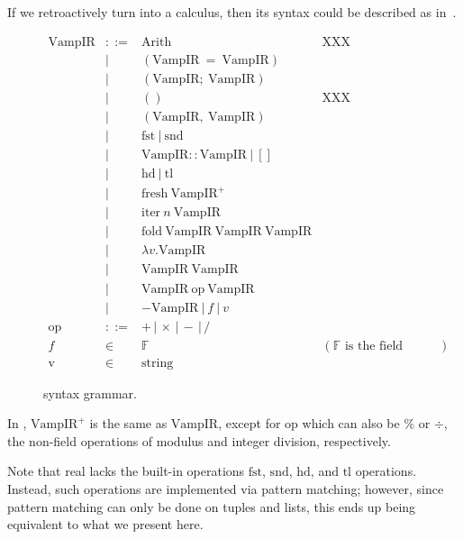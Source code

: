 \documentclass[
    9pt,            
    techreport,       
    affiltop,       
]{art}
\begin{document}
If we retroactively turn \VampIR{} into a calculus, then
its syntax could be described as in~.

\begin{figure}[!htb]
\begin{equation*}
\begin{array}{rclr}
    \text{VampIR} &::= &\text{Arith} &\text{XXX}\\
    &| &(\text{VampIR} \ = \ \text{VampIR}) &\\
    &| &(\text{VampIR};\ \text{VampIR}) &\\
    &| &() &\text{XXX}\\
    &| &(\text{VampIR},\ \text{VampIR}) &\\
    &| &\text{fst}\ |\ \text{snd} &\\
    &| &\text{VampIR}:: \text{VampIR}\ |\ [] &\\
    &| &\text{hd}\ |\ \text{tl} &\\
    &| &\text{fresh}\ \text{VampIR}^+ &\\
    &| &\text{iter}\ n\ \text{VampIR} &\\
    &| &\text{fold}\ \text{VampIR}\ \text{VampIR}\ \text{VampIR} &\\
    &| &\lambda v . \text{VampIR} &\\
    &| &\text{VampIR}\ \text{VampIR} &\\
    &| &\text{VampIR} \ \text{op} \ \text{VampIR} &\\
    &| &- \text{VampIR}\ |\ f\ |\ v &\\[2mm]
    \text{op} &::= &+ \,|\, \times \,|\, - \,|\, / &\\
    f &\in &\mathbb{F} &(\text{$\mathbb{F}$ is the field associated with the circuit.})\\
    \text{v} &\in &\text{string}
\end{array}
\end{equation*}
\caption{\VampIR{} syntax grammar.}
\label{fig:grammar}
\end{figure}

\begin{remark}
In , $\text{VampIR}^+$ is the same as $\text{VampIR}$, except for $\text{op}$ which can also be $\%$ or $\div$, the non-field operations of modulus and integer division, respectively.
\end{remark}

\begin{remark}
Note that real \VampIR{} lacks the built-in operations $\text{fst}$, $\text{snd}$, $\text{hd}$, and $\text{tl}$ operations. 
Instead, such operations are implemented via pattern matching; however, since pattern matching can only be done on tuples and lists, this ends up being equivalent to what we present here.
\end{remark}
\end{document}

